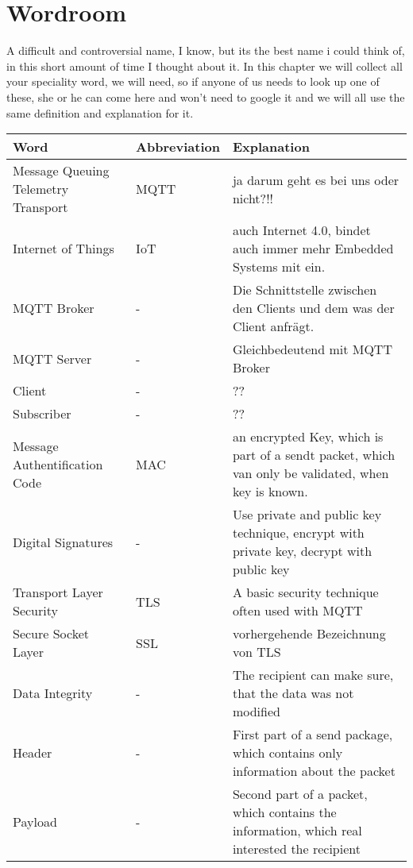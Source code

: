 \section{Wordroom}
A difficult and controversial name, I know, but its the best name i could think of, in this short amount of time I thought about it.
\newline
In this chapter we will collect all your speciality word, we will need, so if anyone of us needs to look up one of these, she or he can come here and won't need to google it and we will all use the same definition and explanation for it.

\begin{center}
\begin{tabular}{ |p{5cm}|p{3cm}|p{7cm}| }
\hline
Word & Abbreviation & Explanation \\
\hline
\hline
Message Queuing Telemetry Transport & MQTT & ja darum geht es bei uns oder nicht?!! \\
\hline
Internet of Things & IoT & auch Internet 4.0, bindet auch immer mehr Embedded Systems mit ein. \\
\hline
MQTT Broker & - & Die Schnittstelle zwischen den Clients und dem was der Client anfrägt. \\
\hline
MQTT Server & - & Gleichbedeutend mit MQTT Broker \\
\hline
Client & - & ?? \\
\hline
Subscriber & - & ?? \\
\hline
Message Authentification Code & MAC & an encrypted Key, which is part of a sendt packet, which van only be validated, when key is known.\\
\hline
Digital Signatures & - & Use private and public key technique, encrypt with private key, decrypt with public key \\
\hline
Transport Layer Security & TLS & A basic security technique often used with MQTT \\
\hline
Secure Socket Layer & SSL & vorhergehende Bezeichnung von TLS \\
\hline
Data Integrity & - & The recipient can make sure, that the data was not modified \\
\hline
Header & - & First part of a send package, which contains only information about the packet \\
\hline
Payload & - & Second part of a packet, which contains the information, which real interested the recipient \\
\hline
\end{tabular}
\end{center}
